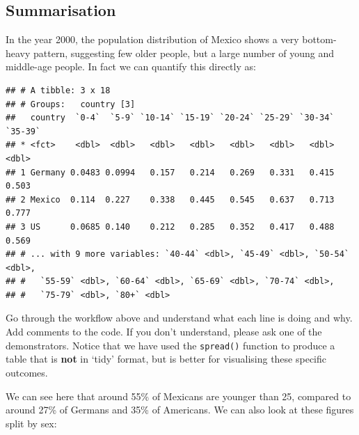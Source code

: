 \documentclass[]{book}
\newenvironment{Shaded}{\begin{snugshade}}{\end{snugshade}}
\newcommand{\KeywordTok}[1]{\textcolor[rgb]{0.13,0.29,0.53}{\textbf{{#1}}}}
\newcommand{\DataTypeTok}[1]{\textcolor[rgb]{0.13,0.29,0.53}{{#1}}}
\newcommand{\StringTok}[1]{\textcolor[rgb]{0.31,0.60,0.02}{{#1}}}
\newcommand{\NormalTok}[1]{{#1}}
\newcommand{\bblockT}[1]{\begin{tcolorbox}[title = Task #1]}
\newcommand{\eblockT}{\end{tcolorbox}}
\theoremstyle{definition}
\theoremstyle{definition}
\theoremstyle{definition}
\theoremstyle{remark}
\begin{document}
\subsection{Summarisation}\label{summarisation}

In the year 2000, the population distribution of Mexico shows a very
bottom-heavy pattern, suggesting few older people, but a large number of
young and middle-age people. In fact we can quantify this directly as:

\begin{Shaded}
\end{Shaded}

\begin{verbatim}
## # A tibble: 3 x 18
## # Groups:   country [3]
##   country  `0-4`  `5-9` `10-14` `15-19` `20-24` `25-29` `30-34` `35-39`
## * <fct>    <dbl>  <dbl>   <dbl>   <dbl>   <dbl>   <dbl>   <dbl>   <dbl>
## 1 Germany 0.0483 0.0994   0.157   0.214   0.269   0.331   0.415   0.503
## 2 Mexico  0.114  0.227    0.338   0.445   0.545   0.637   0.713   0.777
## 3 US      0.0685 0.140    0.212   0.285   0.352   0.417   0.488   0.569
## # ... with 9 more variables: `40-44` <dbl>, `45-49` <dbl>, `50-54` <dbl>,
## #   `55-59` <dbl>, `60-64` <dbl>, `65-69` <dbl>, `70-74` <dbl>,
## #   `75-79` <dbl>, `80+` <dbl>
\end{verbatim}

\hypertarget{tsk25}{}\bblockT{25}

Go through the workflow above and understand what each line is doing and
why. Add comments to the code. If you don't understand, please ask one
of the demonstrators. Notice that we have used the \texttt{spread()}
function to produce a table that is \textbf{not} in `tidy' format, but
is better for visualising these specific outcomes. \eblockT

We can see here that around 55\% of Mexicans are younger than 25,
compared to around 27\% of Germans and 35\% of Americans. We can also
look at these figures split by sex:
\end{document}
